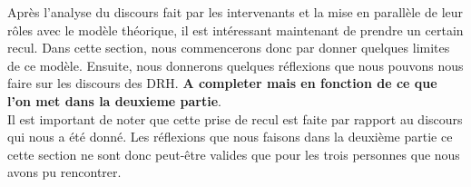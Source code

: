 Après l'analyse du discours fait par les intervenants et la mise en parallèle de leur rôles avec le modèle théorique, il est intéressant maintenant de prendre un certain recul. Dans cette section, nous commencerons donc par donner quelques limites de ce modèle. Ensuite, nous donnerons quelques  réflexions que nous pouvons nous faire sur les discours des DRH. \textbf{A completer mais en fonction de ce que l'on met dans la deuxieme partie}.\\

Il est important de noter que cette prise de recul est faite par rapport au discours qui nous a été donné. Les réflexions que nous faisons dans la deuxième partie ce cette section ne sont donc peut-être valides que pour les trois personnes que nous avons pu rencontrer. \\